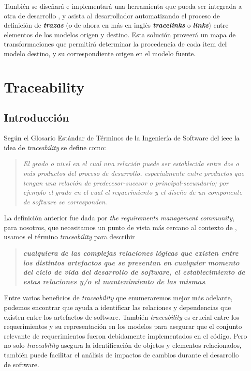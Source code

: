 \documentclass[a4paper,12pt,oneside,spanish]{book}
\begin{document}
También se diseñará e implementará una herramienta que pueda ser integrada a otra de desarrollo , y asista al desarrollador automatizando el proceso de definición de \textit{\textbf{trazas}} (o de ahora en más en inglés \textit{\textbf{tracelinks}} o \textit{\textbf{links}}) entre elementos de los modelos origen y destino. Esta solución proveerá un mapa de transformaciones que permitirá determinar la procedencia de cada ítem del modelo destino, y su correspondiente origen en el modelo fuente.


\mainmatter

\chapter{Traceability}

\section{Introducción}

Según el Glosario Estándar de Términos de la Ingeniería de Software del \gls{ieee} \cite{IEEE} la idea de \textit{traceability} se define como: 
\begin{quote}
\small \textit{El grado o nivel en el cual una relación puede ser establecida entre dos o más productos del proceso de desarrollo, especialmente entre productos que tengan una relación de predecesor-sucesor o principal-secundario; por ejemplo el grado en el cual el requerimiento y el diseño de un componente de software se corresponden}.
\end{quote}

La definición anterior fue dada por \textit{the requirements management community}, para nosotros, que necesitamos un punto de vista más cercano al contexto de , usamos el término \textit{traceability} para describir 
\begin{quote}
\small \textit{\textbf{cualquiera de las complejas relaciones lógicas que existen entre los distintos artefactos que se presentan en cualquier momento del ciclo de vida del desarrollo de software, el establecimiento de estas relaciones y/o el mantenimiento de las mismas}}.
\end{quote}

Entre varios beneficios de \textit{traceability} que enumeraremos mejor más adelante, podemos encontrar que ayuda a identificar las relaciones y dependencias que existen entre los artefactos de software. También \textit{traceability} es crucial entre los requerimientos y su representación en los modelos para asegurar que el conjunto relevante de requerimientos fueron debidamente implementados en el código. Pero no solo \textit{traceability} asegura la identificación de objetos y elementos relacionados, también puede facilitar el análisis de impactos de cambios durante el desarrollo de software.
\end{document}

